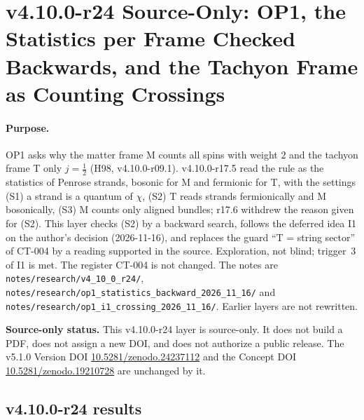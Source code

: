 
\clearpage
\section*{v4.10.0-r24 Source-Only: OP1, the Statistics per Frame Checked Backwards, and the Tachyon Frame as Counting Crossings}
\label{sec:v4100-r24-op1-crossing}

\paragraph{Purpose.}
OP1 asks why the matter frame M counts all spins with weight \(2\) and the tachyon frame T only \(j=\tfrac12\) (H98, v4.10.0-r09.1).
v4.10.0-r17.5 read the rule as the statistics of Penrose strands, bosonic for M and fermionic for T, with the settings (S1) a strand is a
quantum of \(\chi\), (S2) T reads strands fermionically and M bosonically, (S3) M counts only aligned bundles; r17.6 withdrew the reason
given for (S2).  This layer checks (S2) by a backward search, follows the deferred idea I1 on the author's decision (2026-11-16), and
replaces the guard ``T = string sector'' of CT-004 by a reading supported in the source.  Exploration, not blind; trigger~3 of I1 is
met.  The register CT-004 is not changed.  The notes are \texttt{notes/\allowbreak research/\allowbreak v4\_10\_0\_r24/},
\texttt{notes/\allowbreak research/\allowbreak op1\_statistics\_backward\_2026\_11\_16/} and
\texttt{notes/\allowbreak research/\allowbreak op1\_i1\_crossing\_2026\_11\_16/}.  Earlier layers are not rewritten.

\noindent\textbf{Source-only status.}
This v4.10.0-r24 layer is source-only.  It does not build a PDF, does not assign a new DOI,
and does not authorize a public release.  The v5.1.0 Version DOI
\href{https://doi.org/10.5281/zenodo.24237112}{10.5281/zenodo.24237112} and the Concept DOI
\href{https://doi.org/10.5281/zenodo.19210728}{10.5281/zenodo.19210728} are unchanged by it.

\subsection*{v4.10.0-r24 results}
\label{subsec:v4100-r24-results}

